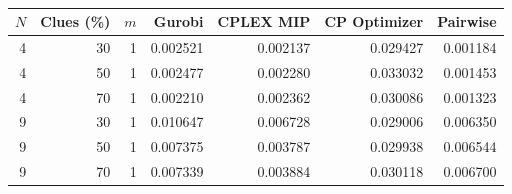 \begin{table}[pos=H]
\centering
\small
\caption{}
\label{tab:c10}
\begin{tabular}{rrrrrrr}
\toprule
$N$ & Clues (\%) & $m$ & Gurobi & CPLEX MIP & CP Optimizer & Pairwise\\
\midrule
4 & 30 & 1 & 0.002521 & 0.002137 & 0.029427 & 0.001184\\
4 & 50 & 1 & 0.002477 & 0.002280 & 0.033032 & 0.001453\\
4 & 70 & 1 & 0.002210 & 0.002362 & 0.030086 & 0.001323\\
9 & 30 & 1 & 0.010647 & 0.006728 & 0.029006 & 0.006350\\
9 & 50 & 1 & 0.007375 & 0.003787 & 0.029938 & 0.006544\\
9 & 70 & 1 & 0.007339 & 0.003884 & 0.030118 & 0.006700\\
\bottomrule
\end{tabular}
\end{table}

